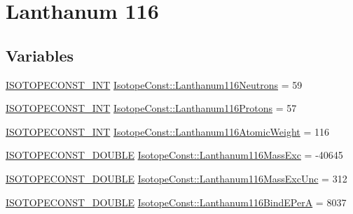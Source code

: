 \hypertarget{group___isotope_const-_lanthanum-_la116}{}\section{Lanthanum 116}
\label{group___isotope_const-_lanthanum-_la116}
\subsection*{Variables}
\begin{DoxyCompactItemize}
\item 
\mbox{\hyperlink{group___isotope_const-_macros_ga5f18360b3e99483a35c32d789e62621c}{I\+S\+O\+T\+O\+P\+E\+C\+O\+N\+S\+T\+\_\+\+I\+NT}} \mbox{\hyperlink{group___isotope_const-_lanthanum-_la116_gab922bc0748674819ae0057f660bd1d2c}{Isotope\+Const\+::\+Lanthanum116\+Neutrons}} = 59
\item 
\mbox{\hyperlink{group___isotope_const-_macros_ga5f18360b3e99483a35c32d789e62621c}{I\+S\+O\+T\+O\+P\+E\+C\+O\+N\+S\+T\+\_\+\+I\+NT}} \mbox{\hyperlink{group___isotope_const-_lanthanum-_la116_ga542f0801f09a53fb63fd7d681117b72f}{Isotope\+Const\+::\+Lanthanum116\+Protons}} = 57
\item 
\mbox{\hyperlink{group___isotope_const-_macros_ga5f18360b3e99483a35c32d789e62621c}{I\+S\+O\+T\+O\+P\+E\+C\+O\+N\+S\+T\+\_\+\+I\+NT}} \mbox{\hyperlink{group___isotope_const-_lanthanum-_la116_ga44c812c879220c0748f1ee4df870e855}{Isotope\+Const\+::\+Lanthanum116\+Atomic\+Weight}} = 116
\item 
\mbox{\hyperlink{group___isotope_const-_macros_ga8f45a7272ce02c0b4c65c44636ed719a}{I\+S\+O\+T\+O\+P\+E\+C\+O\+N\+S\+T\+\_\+\+D\+O\+U\+B\+LE}} \mbox{\hyperlink{group___isotope_const-_lanthanum-_la116_gac07bb2ce502e500996fc9e7f9acc6959}{Isotope\+Const\+::\+Lanthanum116\+Mass\+Exc}} = -\/40645
\item 
\mbox{\hyperlink{group___isotope_const-_macros_ga8f45a7272ce02c0b4c65c44636ed719a}{I\+S\+O\+T\+O\+P\+E\+C\+O\+N\+S\+T\+\_\+\+D\+O\+U\+B\+LE}} \mbox{\hyperlink{group___isotope_const-_lanthanum-_la116_gaafa08e39966ffceb5c01b171de3385b0}{Isotope\+Const\+::\+Lanthanum116\+Mass\+Exc\+Unc}} = 312
\item 
\mbox{\hyperlink{group___isotope_const-_macros_ga8f45a7272ce02c0b4c65c44636ed719a}{I\+S\+O\+T\+O\+P\+E\+C\+O\+N\+S\+T\+\_\+\+D\+O\+U\+B\+LE}} \mbox{\hyperlink{group___isotope_const-_lanthanum-_la116_gab36f7b8110d1063ceb18d44c9d58425a}{Isotope\+Const\+::\+Lanthanum116\+Bind\+E\+PerA}} = 8037
\item 

\end{DoxyCompactItemize}
